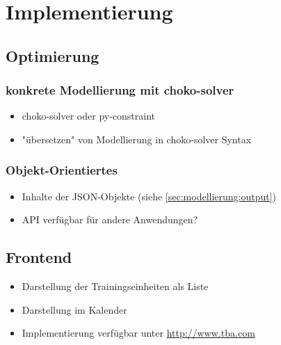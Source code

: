 \chapter{Implementierung}
\label{sec:implementierung} 
\section{Optimierung}
\subsection{konkrete Modellierung mit choko-solver}
\begin{itemize}
    \item choko-solver oder py-constraint
    \item "übersetzen" von Modellierung in choko-solver Syntax
\end{itemize}

\subsection{Objekt-Orientiertes }
\begin{itemize}
    \item Inhalte der JSON-Objekte (siehe \ref{sec:modellierung:output})
    \item API verfügbar für andere Anwendungen?
\end{itemize}

\section{Frontend}
\begin{itemize}
    \item Darstellung der Trainingseinheiten als Liste
    \item Darstellung im Kalender  
    \item Implementierung verfügbar unter \url{http://www.tba.com}
\end{itemize}
